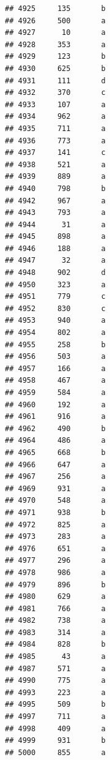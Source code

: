 \documentclass[
]{book}
\begin{document}
\begin{verbatim}
## 4925     135       b
## 4926     500       a
## 4927      10       a
## 4928     353       a
## 4929     123       b
## 4930     625       b
## 4931     111       d
## 4932     370       c
## 4933     107       a
## 4934     962       a
## 4935     711       a
## 4936     773       a
## 4937     141       c
## 4938     521       a
## 4939     889       a
## 4940     798       b
## 4942     967       a
## 4943     793       a
## 4944      31       a
## 4945     898       a
## 4946     188       a
## 4947      32       a
## 4948     902       d
## 4950     323       a
## 4951     779       c
## 4952     830       c
## 4953     940       a
## 4954     802       a
## 4955     258       b
## 4956     503       a
## 4957     166       a
## 4958     467       a
## 4959     584       a
## 4960     192       a
## 4961     916       a
## 4962     490       b
## 4964     486       a
## 4965     668       b
## 4966     647       a
## 4967     256       a
## 4969     931       a
## 4970     548       a
## 4971     938       b
## 4972     825       a
## 4973     283       a
## 4976     651       a
## 4977     296       a
## 4978     986       a
## 4979     896       b
## 4980     629       a
## 4981     766       a
## 4982     738       a
## 4983     314       a
## 4984     828       b
## 4985      43       a
## 4987     571       a
## 4990     775       a
## 4993     223       a
## 4995     509       b
## 4997     711       a
## 4998     409       a
## 4999     931       b
## 5000     855       a
\end{verbatim}
\end{document}
